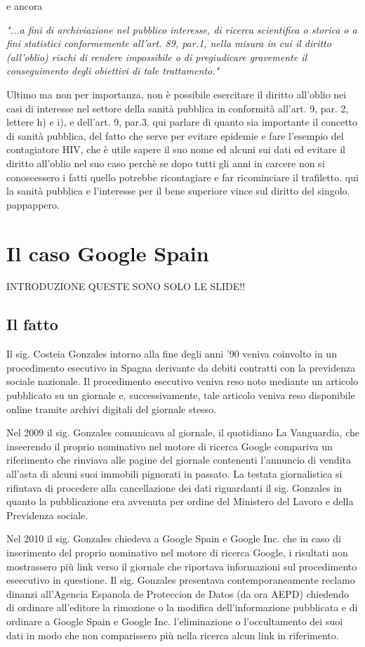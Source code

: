 e ancora

\textit{"...a fini di archiviazione nel pubblico interesse, di ricerca scientifica o storica o a fini statistici conformemente all'art. 89, par.1, nella misura in cui il diritto (all'oblio) rischi di rendere impossibile o di pregiudicare gravemente il conseguimento degli obiettivi di tale trattamento."}

Ultimo ma non per importanza, non è possibile esercitare il diritto all'oblio nei casi di interesse nel settore della sanità pubblica in conformità all'art. 9, par. 2, lettere h) e i), e dell'art. 9, par.3.
qui parlare di quanto sia importante il concetto di sanità pubblica, del fatto che serve per evitare epidemie e fare l'esempio del contagiatore HIV, che è utile sapere il suo nome ed alcuni sui dati ed evitare il diritto all'oblio nel suo caso perchè se dopo tutti gli anni in carcere non si conoscessero i fatti quello potrebbe ricontagiare e far ricominciare il trafiletto. qui la sanità pubblica e l'interesse per il bene superiore vince sul diritto del singolo. pappappero.

\section{Il caso Google Spain}
INTRODUZIONE
QUESTE SONO SOLO LE SLIDE!!
\subsection{Il fatto}
Il sig. Costeia Gonzales intorno alla fine degli anni '90 veniva coinvolto in un procedimento esecutivo in Spagna derivante da debiti contratti con la previdenza sociale nazionale. Il procedimento esecutivo veniva reso noto mediante un articolo pubblicato su un giornale e, successivamente, tale articolo veniva reso disponibile online tramite archivi digitali del giornale stesso. 

Nel 2009 il sig. Gonzales comunicava al giornale, il quotidiano La Vanguardia, che inseerendo il proprio nominativo nel motore di ricerca Google compariva  un riferimento che rinviava alle pagine del giornale contenenti l'annuncio di vendita all'asta di alcuni suoi immobili pignorati in passato. La testata giornalistica si rifiutava di procedere alla cancellazione dei dati riguardanti il sig. Gonzales in quanto la pubblicazione era avvenuta per ordine del Ministero del Lavoro e della Previdenza sociale.

Nel 2010 il sig. Gonzales chiedeva a Google Spain e Google Inc. che in caso di inserimento del  proprio nominativo nel motore di ricerca Google, i risultati non mostrassero più link verso il giornale che riportava informazioni sul procedimento eseecutivo in questione. Il  sig. Gonzales presentava contemporaneamente reclamo dinanzi all'Agencia Espanola de Proteccion de Datos (da ora AEPD) chiedendo di ordinare all'editore la rimozione o la modifica dell'informazione pubblicata e di ordinare a Google Spain e Google Inc. l'eliminazione o l'occultamento dei suoi dati in modo che non comparissero più nella ricerca alcun link in riferimento.


